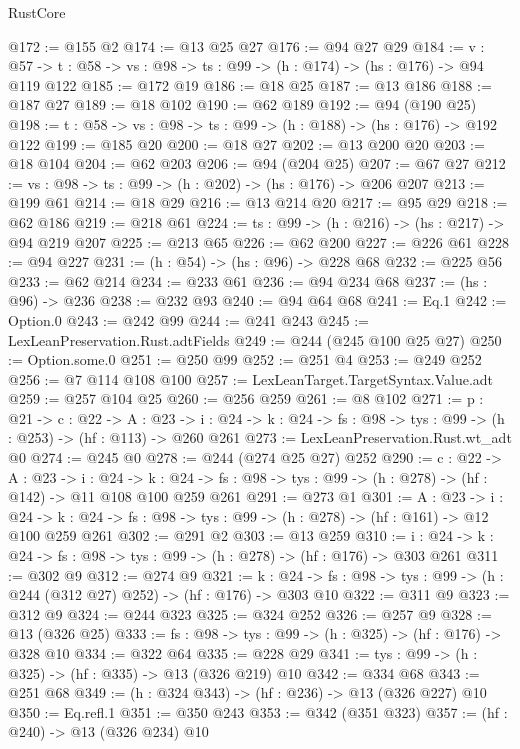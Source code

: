 \begin{lexlean}{RustCore}
\begin{coremodule}
@172 := @155 @2
@174 := @13 @25 @27
@176 := @94 @27 @29
@184 := {v : @57} ->
  {t : @58} -> {vs : @98} -> {ts : @99} -> (h : @174) -> (hs : @176) -> @94 @119 @122
@185 := @172 @19
@186 := @18 @25
@187 := @13 @186
@188 := @187 @27
@189 := @18 @102
@190 := @62 @189
@192 := @94 (@190 @25)
@198 := {t : @58} -> {vs : @98} -> {ts : @99} -> (h : @188) -> (hs : @176) -> @192 @122
@199 := @185 @20
@200 := @18 @27
@202 := @13 @200 @20
@203 := @18 @104
@204 := @62 @203
@206 := @94 (@204 @25)
@207 := @67 @27
@212 := {vs : @98} -> {ts : @99} -> (h : @202) -> (hs : @176) -> @206 @207
@213 := @199 @61
@214 := @18 @29
@216 := @13 @214 @20
@217 := @95 @29
@218 := @62 @186
@219 := @218 @61
@224 := {ts : @99} -> (h : @216) -> (hs : @217) -> @94 @219 @207
@225 := @213 @65
@226 := @62 @200
@227 := @226 @61
@228 := @94 @227
@231 := (h : @54) -> (hs : @96) -> @228 @68
@232 := @225 @56
@233 := @62 @214
@234 := @233 @61
@236 := @94 @234 @68
@237 := (hs : @96) -> @236
@238 := @232 @93
@240 := @94 @64 @68
@241 := Eq.{1}
@242 := Option.{0}
@243 := @242 @99
@244 := @241 @243
@245 := LexLeanPreservation.Rust.adtFields
@249 := @244 (@245 @100 @25 @27)
@250 := Option.some.{0}
@251 := @250 @99
@252 := @251 @4
@253 := @249 @252
@256 := @7 @114 @108 @100
@257 := LexLeanTarget.TargetSyntax.Value.adt
@259 := @257 @104 @25
@260 := @256 @259
@261 := @8 @102
@271 := {p : @21} ->
  {c : @22} ->
  {A : @23} ->
  {i : @24} -> {k : @24} -> {fs : @98} -> {tys : @99} -> (h : @253) -> (hf : @113) -> @260 @261
@273 := LexLeanPreservation.Rust.wt_adt @0
@274 := @245 @0
@278 := @244 (@274 @25 @27) @252
@290 := {c : @22} ->
  {A : @23} ->
  {i : @24} ->
  {k : @24} -> {fs : @98} -> {tys : @99} -> (h : @278) -> (hf : @142) -> @11 @108 @100 @259 @261
@291 := @273 @1
@301 := {A : @23} ->
  {i : @24} ->
  {k : @24} -> {fs : @98} -> {tys : @99} -> (h : @278) -> (hf : @161) -> @12 @100 @259 @261
@302 := @291 @2
@303 := @13 @259
@310 := {i : @24} ->
  {k : @24} -> {fs : @98} -> {tys : @99} -> (h : @278) -> (hf : @176) -> @303 @261
@311 := @302 @9
@312 := @274 @9
@321 := {k : @24} ->
  {fs : @98} -> {tys : @99} -> (h : @244 (@312 @27) @252) -> (hf : @176) -> @303 @10
@322 := @311 @9
@323 := @312 @9
@324 := @244 @323
@325 := @324 @252
@326 := @257 @9
@328 := @13 (@326 @25)
@333 := {fs : @98} -> {tys : @99} -> (h : @325) -> (hf : @176) -> @328 @10
@334 := @322 @64
@335 := @228 @29
@341 := {tys : @99} -> (h : @325) -> (hf : @335) -> @13 (@326 @219) @10
@342 := @334 @68
@343 := @251 @68
@349 := (h : @324 @343) -> (hf : @236) -> @13 (@326 @227) @10
@350 := Eq.refl.{1}
@351 := @350 @243
@353 := @342 (@351 @323)
@357 := (hf : @240) -> @13 (@326 @234) @10

\end{coremodule}
\end{lexlean}
